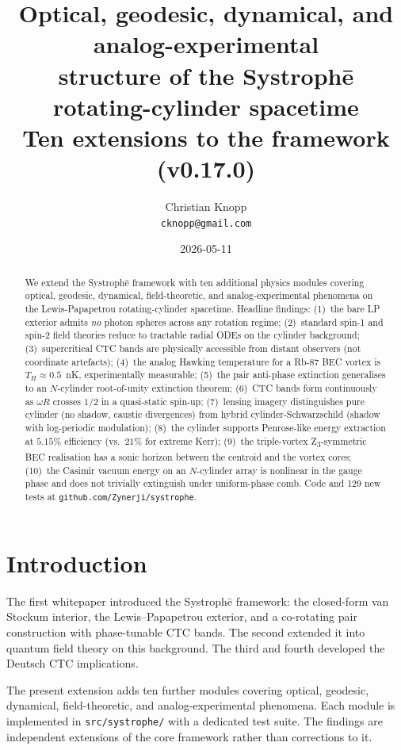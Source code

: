 \documentclass[11pt,a4paper]{article}
\title{\bfseries Optical, geodesic, dynamical, and analog-experimental\\
structure of the Systroph\=e rotating-cylinder spacetime\\
\large Ten extensions to the framework (v0.17.0)}
\author{Christian Knopp\\\texttt{cknopp@gmail.com}}
\date{2026-05-11}
\begin{document}
\maketitle

\begin{abstract}
We extend the Systroph\=e framework \cite{Knopp2026Systrophe,Knopp2026QFTCS}
with ten additional physics modules covering optical, geodesic,
dynamical, field-theoretic, and analog-experimental phenomena on the
Lewis-Papapetrou rotating-cylinder spacetime. Headline findings:
(1)~the bare LP exterior admits \emph{no} photon spheres across any
rotation regime; (2)~standard spin-1 and spin-2 field theories
reduce to tractable radial ODEs on the cylinder background;
(3)~supercritical CTC bands are physically accessible from distant
observers (not coordinate artefacts); (4)~the analog Hawking
temperature for a Rb-87 BEC vortex is $T_H \approx 0.5$~nK,
experimentally measurable; (5)~the pair anti-phase extinction
generalises to an $N$-cylinder root-of-unity extinction theorem;
(6)~CTC bands form continuously as $\omega R$ crosses $1/2$ in a
quasi-static spin-up; (7)~lensing imagery distinguishes pure cylinder
(no shadow, caustic divergences) from hybrid cylinder-Schwarzschild
(shadow with log-periodic modulation); (8)~the cylinder supports
Penrose-like energy extraction at $5.15\%$ efficiency (vs.\ $21\%$ for
extreme Kerr); (9)~the triple-vortex Z\textsubscript{3}-symmetric BEC
realisation has a sonic horizon between the centroid and the vortex
cores; (10)~the Casimir vacuum energy on an $N$-cylinder array is
nonlinear in the gauge phase and does not trivially extinguish
under uniform-phase comb. Code and 129 new tests at
\texttt{github.com/Zynerji/systrophe}.
\end{abstract}

\section{Introduction}

The first whitepaper \cite{Knopp2026Systrophe} introduced the
Systroph\=e framework: the closed-form van Stockum interior, the
Lewis--Papapetrou exterior, and a co-rotating pair construction with
phase-tunable CTC bands. The second \cite{Knopp2026QFTCS} extended it
into quantum field theory on this background. The third and fourth
\cite{Knopp2026DCTC,Knopp2026DCTCcycles} developed the Deutsch CTC
implications.

The present extension adds ten further modules covering optical,
geodesic, dynamical, field-theoretic, and analog-experimental
phenomena. Each module is implemented in \texttt{src/systrophe/}
with a dedicated test suite. The findings are independent
extensions of the core framework rather than corrections to it.
\end{document}
